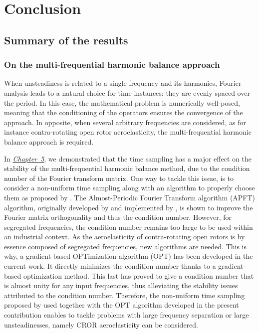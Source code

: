 
\chapter*{Conclusion}

\section*{Summary of the results}

\subsection*{On the multi-frequential harmonic balance approach}

When unsteadiness is related to a single frequency and its
harmonics, Fourier analysis leads to a natural choice for time instances:
they are evenly spaced over the period. In this case, the mathematical
problem is numerically well-posed, meaning that the conditioning of
the operators ensures the convergence of the approach.
In opposite, when several arbitrary frequencies are 
considered, as for instance contra-rotating open rotor
aeroelasticity, the multi-frequential harmonic balance approach
is required.

In \hyperref[cha:limitations_condition_number]{\emph{Chapter~5}},
we demonstrated that the time sampling has a major effect on the
stability of the multi-frequential harmonic balance 
method, due to the condition number of the Fourier
transform matrix. One way to tackle this issue, 
is to consider a non-uniform time sampling
along with an algorithm to properly choose them
as proposed by \citet{ThesisGuedeney}.
The Almost-Periodic Fourier Transform algorithm (APFT) 
algorithm, originally developed by \citet{Kundert1988} and implemented by 
\citet{ThesisGuedeney}, is shown to improve the
Fourier matrix orthogonality and thus the condition number.
However, for segregated frequencies, the condition number
remains too large to be used within an industrial context.
As the aeroelasticity of contra-rotating open rotors is by essence
composed of segregated frequencies, new algorithms are needed.
This is why, a gradient-based OPTimization algorithm (OPT) 
has been developed in the current work.
It directly minimizes the condition number thanks to a
gradient-based optimization method. This last has proved to
give a condition number that is almost unity for any input frequencies,
thus alleviating the stability issues attributed to 
the condition number.
Therefore, the non-uniform time sampling proposed by \citet{ThesisGuedeney}
used together with the OPT algorithm 
developed in the present contribution
enables to tackle problems with large frequency 
separation or large unsteadinesses, namely CROR aeroelasticity
can be considered.

